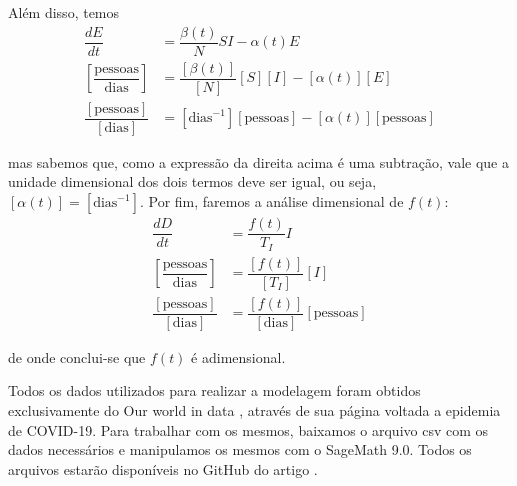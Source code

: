 \documentclass{article}
\begin{document}
Além disso, temos
\begin{equation*}
    \begin{split}
        \dfrac{dE}{dt} & = \dfrac{\beta(t)}{N}SI - \alpha(t) E \\
        \left[\dfrac{\text{pessoas}}{\text{dias}}\right] & = \dfrac{[\beta(t)]}{[N]}[S][I] - [\alpha(t)][E] \\
        \dfrac{[\text{pessoas}]}{[\text{dias}]} & = [\text{dias}^{-1}][\text{pessoas}] - [\alpha(t)][\text{pessoas}]
    \end{split}
\end{equation*}

\noindent mas sabemos que, como a expressão da direita acima é uma subtração, vale que a unidade dimensional dos dois termos deve ser igual, ou seja, $[\alpha(t)] = [\text{dias}^{-1}]$. Por fim, faremos a análise dimensional de $f(t)$:
\begin{equation*}
    \begin{split}
        \dfrac{dD}{dt} & = \dfrac{f(t)}{T_I}I \\
        \left[\dfrac{\text{pessoas}}{\text{dias}}\right] & = \dfrac{[f(t)]}{[T_I]}[I] \\
        \dfrac{[\text{pessoas}]}{[\text{dias}]} & = \dfrac{[f(t)]}{[\text{dias}]}[\text{pessoas}]
    \end{split}
\end{equation*}

\noindent de onde conclui-se que $f(t)$ é adimensional.

% 
Todos os dados utilizados para realizar a modelagem foram obtidos exclusivamente do Our world in data \cite{owid}, através de sua página voltada a epidemia de COVID-19. Para trabalhar com os mesmos, baixamos o arquivo csv com os dados necessários e manipulamos os mesmos com o SageMath 9.0. Todos os arquivos estarão disponíveis no GitHub do artigo \cite{github}.

\printbibliography
\end{document}
